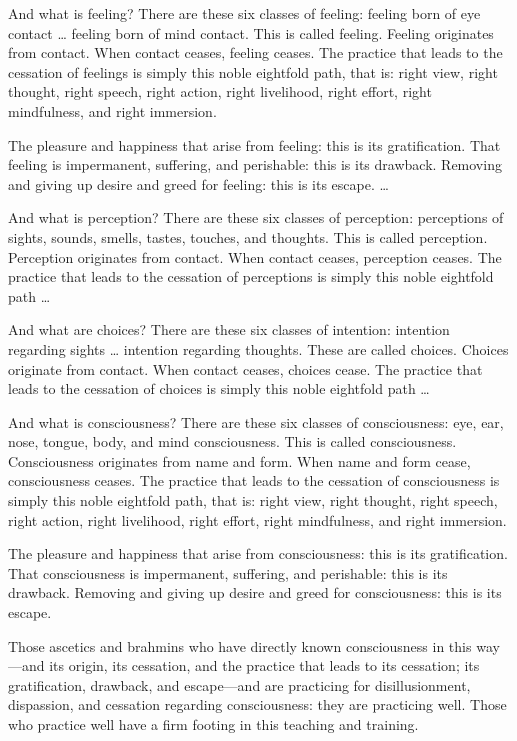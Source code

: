\documentclass[12pt,openany]{book}%
\begin{document}
And what is feeling? There are these six classes of feeling: feeling born of eye contact … feeling born of mind contact. This is called feeling. Feeling originates from contact. When contact ceases, feeling ceases. The practice that leads to the cessation of feelings is simply this noble eightfold path, that is: right view, right thought, right speech, right action, right livelihood, right effort, right mindfulness, and right immersion. 

The pleasure and happiness that arise from feeling: this is its gratification. That feeling is impermanent, suffering, and perishable: this is its drawback. Removing and giving up desire and greed for feeling: this is its escape. … 

And what is perception? There are these six classes of perception: perceptions of sights, sounds, smells, tastes, touches, and thoughts. This is called perception. Perception originates from contact. When contact ceases, perception ceases. The practice that leads to the cessation of perceptions is simply this noble eightfold path … 

And what are choices? There are these six classes of intention: intention regarding sights … intention regarding thoughts. These are called choices. Choices originate from contact. When contact ceases, choices cease. The practice that leads to the cessation of choices is simply this noble eightfold path … 

And what is consciousness? There are these six classes of consciousness: eye, ear, nose, tongue, body, and mind consciousness. This is called consciousness. Consciousness originates from name and form. When name and form cease, consciousness ceases. The practice that leads to the cessation of consciousness is simply this noble eightfold path, that is: right view, right thought, right speech, right action, right livelihood, right effort, right mindfulness, and right immersion. 

The pleasure and happiness that arise from consciousness: this is its gratification. That consciousness is impermanent, suffering, and perishable: this is its drawback. Removing and giving up desire and greed for consciousness: this is its escape. 

Those ascetics and brahmins who have directly known consciousness in this way—and its origin, its cessation, and the practice that leads to its cessation; its gratification, drawback, and escape—and are practicing for disillusionment, dispassion, and cessation regarding consciousness: they are practicing well. Those who practice well have a firm footing in this teaching and training. 
\end{document}
